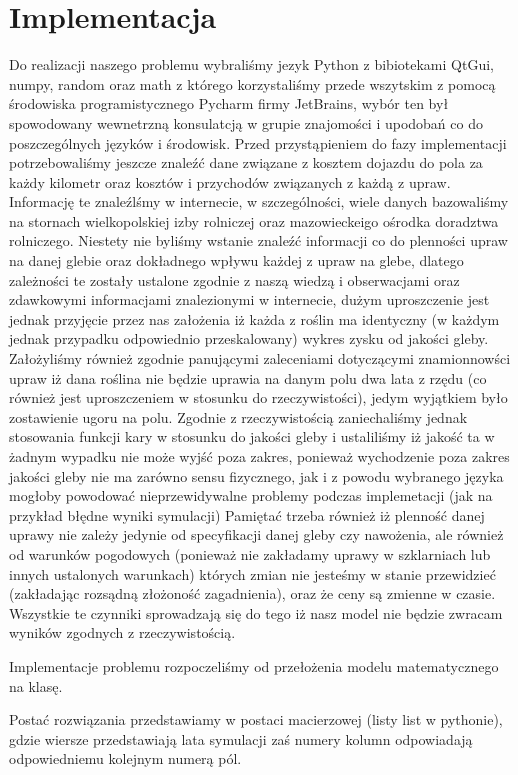 \documentclass{article}
\begin{document}
\section{Implementacja}
Do realizacji naszego problemu wybraliśmy jezyk Python z bibiotekami QtGui, numpy, random oraz math z którego korzystaliśmy przede wszytskim z pomocą środowiska programistycznego Pycharm firmy JetBrains,
wybór ten był spowodowany wewnetrzną konsulatcją w grupie znajomości i upodobań co do poszczególnych języków i środowisk.
Przed przystąpieniem do fazy implementacji potrzebowaliśmy jeszcze znaleźć dane związane z kosztem dojazdu do pola za każdy kilometr oraz kosztów i przychodów związanych z każdą z upraw. Informację te znaleźlśmy w internecie, w szczególności, wiele danych bazowaliśmy na stornach wielkopolskiej izby rolniczej oraz mazowieckeigo ośrodka doradztwa rolniczego.
Niestety nie byliśmy wstanie znaleźć informacji co do plenności upraw na danej glebie oraz dokładnego wpływu każdej z upraw na glebe, dlatego zależności te zostały ustalone zgodnie z naszą wiedzą i obserwacjami oraz zdawkowymi informacjami znalezionymi w internecie, dużym uproszczenie jest jednak przyjęcie przez nas założenia iż każda z roślin ma identyczny (w każdym jednak przypadku odpowiednio przeskalowany) wykres zysku od jakości gleby.
Założyliśmy również zgodnie panującymi zaleceniami dotyczącymi znamionnowści upraw iż dana roślina nie będzie uprawia na danym polu dwa lata z rzędu (co również jest uproszczeniem w stosunku do rzeczywistości), jedym wyjątkiem było zostawienie ugoru na polu.
Zgodnie z rzeczywistością zaniechaliśmy jednak stosowania funkcji kary w stosunku do jakości gleby i ustaliliśmy iż jakość  ta w żadnym wypadku nie może wyjść poza zakres, ponieważ wychodzenie poza zakres jakości gleby nie ma zarówno sensu fizycznego, jak i z powodu wybranego języka mogłoby powodować nieprzewidywalne problemy podczas implemetacji (jak na przykład błędne wyniki symulacji)
Pamiętać trzeba również iż plenność danej uprawy nie zależy jedynie od specyfikacji danej gleby czy nawożenia, ale również od warunków pogodowych (ponieważ nie zakładamy uprawy w szklarniach lub innych ustalonych warunkach) których zmian nie jesteśmy w stanie przewidzieć (zakładając rozsądną złożoność zagadnienia),
oraz że ceny są zmienne w czasie.
Wszystkie te czynniki sprowadzają się do tego iż nasz model nie będzie zwracam wyników zgodnych z rzeczywistością.

Implementacje problemu rozpoczeliśmy od przełożenia modelu matematycznego na klasę.

\label{postac_rozw}
Postać rozwiązania przedstawiamy w postaci macierzowej (listy list w pythonie), gdzie wiersze przedstawiają lata symulacji zaś numery kolumn odpowiadają odpowiedniemu kolejnym numerą pól.
\end{document}
